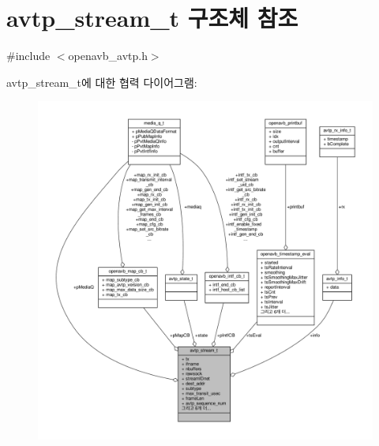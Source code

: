 \hypertarget{structavtp__stream__t}{}\section{avtp\+\_\+stream\+\_\+t 구조체 참조}
\label{structavtp__stream__t}


{\ttfamily \#include $<$openavb\+\_\+avtp.\+h$>$}



avtp\+\_\+stream\+\_\+t에 대한 협력 다이어그램\+:
\nopagebreak
\begin{figure}[H]
\begin{center}
\leavevmode
\includegraphics[width=350pt]{structavtp__stream__t__coll__graph}
\end{center}
\end{figure}
